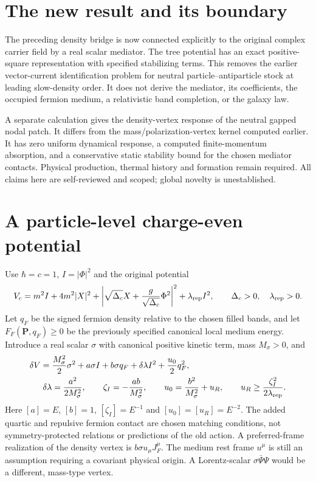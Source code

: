 \documentclass[11pt]{article}
\begin{document}
\section{The new result and its boundary}
The preceding density bridge is now connected explicitly to the original
complex carrier field by a real scalar mediator. The tree potential has
an exact positive-square representation with specified stabilizing terms.
This removes the earlier vector-current identification problem for neutral
particle--antiparticle stock at leading slow-density order. It does not
derive the mediator, its coefficients, the occupied fermion medium, a
relativistic band completion, or the galaxy law.

A separate calculation gives the density-vertex response of the neutral
gapped nodal patch. It differs from the mass/polarization-vertex kernel
computed earlier. It has zero uniform dynamical response, a computed
finite-momentum absorption, and a conservative static stability bound for
the chosen mediator contacts. Physical production, thermal history and
formation remain required. All claims here are self-reviewed and scoped;
global novelty is unestablished.

\section{A particle-level charge-even potential}
Use $\hbar=c=1$, $I=|\Phi|^2$ and the original potential
\begin{equation}
 V_c=m^2I+4m^2|X|^2+
       \left|\sqrt{\Delta_c}X+{g\over\sqrt{\Delta_c}}\Phi^2\right|^2
       +\lambda_{\rm rep}I^2,
 \qquad \Delta_c>0,\quad\lambda_{\rm rep}>0.
\end{equation}
Let $q_F$ be the signed fermion density relative to the chosen filled
bands, and let $F_F(\mathbf P,q_F)\geq0$ be the previously specified
canonical local medium energy. Introduce a real scalar $\sigma$ with
canonical positive kinetic term, mass $M_\sigma>0$, and
\begin{align}
 \delta V={}&{M_\sigma^2\over2}\sigma^2
       +a\sigma I+b\sigma q_F
       +\delta\lambda I^2+{u_0\over2}q_F^2,\\
 \delta\lambda&={a^2\over2M_\sigma^2},\qquad
 \zeta_I=-{ab\over M_\sigma^2},\qquad
 u_0={b^2\over M_\sigma^2}+u_R,\qquad
 u_R\geq{\zeta_I^2\over2\lambda_{\rm rep}}.
 \label{ns:parameters}
\end{align}
Here $[a]=E$, $[b]=1$, $[\zeta_I]=E^{-1}$ and $[u_0]=[u_R]=E^{-2}$.
The added quartic and repulsive fermion contact are chosen matching
conditions, not symmetry-protected relations or predictions of the old
action. A preferred-frame realization of the density vertex is
$b\sigma u_\mu J_F^\mu$. The medium rest frame $u^\mu$ is still an
assumption requiring a covariant physical origin. A Lorentz-scalar
$\sigma\bar\Psi\Psi$ would be a different, mass-type vertex.
\end{document}

